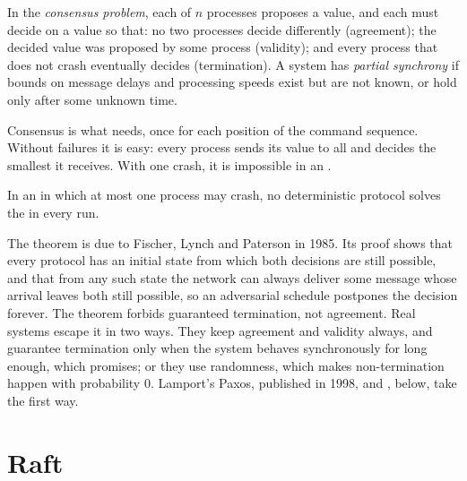 \begin{definition}\label{def:b3:replication-and-consensus:consensus}
In the \emph{consensus problem}, each of $n$ processes proposes a value, and each must decide on a value so that: no two processes decide differently (agreement); the decided value was proposed by some process (validity); and every process that does not crash eventually decides (termination). A system has \emph{partial synchrony} if bounds on message delays and processing speeds exist but are not known, or hold only after some unknown time.
\end{definition}

Consensus is what  needs, once for each position of the command sequence. Without failures it is easy: every process sends its value to all and decides the smallest it receives. With one crash, it is impossible in an .

\begin{theorem}\label{thm:b3:replication-and-consensus:flp}
In an  in which at most one process may crash, no deterministic protocol solves the  in every run.
\end{theorem}

\admitted

The theorem is due to Fischer, Lynch and Paterson in 1985. %
Its proof shows that every protocol has an initial state from which both decisions are still possible, and that from any such state the network can always deliver some message whose arrival leaves both still possible, so an adversarial schedule postpones the decision forever. The theorem forbids guaranteed termination, not agreement. Real systems escape it in two ways. They keep agreement and validity always, and guarantee termination only when the system behaves synchronously for long enough, which  promises; or they use randomness, which makes non-termination happen with probability 0. Lamport's Paxos, published in 1998, and , below, take the first way. %

\section{Raft}\label{sec:b3:replication-and-consensus:raft}

